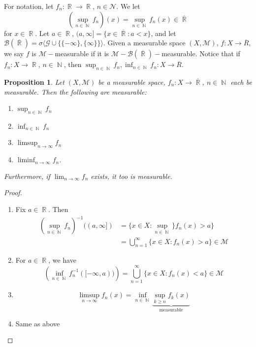 \documentclass[12pt, a4paper]{memoir}
\DeclareMathOperator{\N}{{\mathbb{N}}}
\DeclareMathOperator{\R}{{\mathbb{R}}}
\newtheorem{proposition}[theorem]{Proposition}
\theoremstyle{nonumberplain}
\newtheorem{proof}{Proof}
\begin{document}
For notation, let $f_n:\R\to\R$, $n\in\mathcal{N}$.
We let
\begin{equation}
    (\sup_{n\in\N} f_n)(x)=\sup_{n\in\N} f_n(x)\in\overline{\R}
\end{equation}
for $x\in \R$.
Let $a\in\R$, $(a,\infty]=\{x\in\overline{\R}:a<x\}$, and let $\mathcal{B}(\overline{\R})=\sigma\langle\mathcal{G}\cup\{\{-\infty\},\{\infty\}\}\rangle$.
Given a measurable space $(X,\mathcal{M})$, $f:X\to\overline{R}$, we say $f$ is $\mathcal{M}-$measurable if it is $\mathcal{M}-\mathcal{B}(\overline{\R})-$measurable.
Notice that if $f_n:X\to\R$, $n\in\N$, then $\sup_{n\in\N}f_n,\inf_{n\in\N}f_n:X\to\overline{R}$.
\begin{proposition}
    Let $(X,\mathcal{M})$ be a measurable space, $f_n:X\to\overline{\R}$, $n\in\N$ each be measurable.
    Then the following are measurable:
    \begin{enumerate}
        \item $\sup_{n\in\N}f_n$
        \item $\inf_{n\in\N}f_n$
        \item $\limsup_{n\to\infty}f_n$
        \item $\liminf_{n\to\infty}f_n$.
    \end{enumerate}
    Furthermore, if $\lim_{n\to\infty}f_n$ exists, it too is measurable.
\end{proposition}
\begin{proof}
    \begin{enumerate}
        \item Fix $a\in\R$.
            Then
            \begin{align*}
                \left(\sup_{n\in\N}f_n\right)^{-1}((a,\infty]) &= \{x\in X:\sup_{n\in\N}\}f_n(x)>a\}\\ %
                                                               &=\bigcup_{n=1}^\infty\{x\in X:f_n(x)>a\}\in\mathcal{M}
            \end{align*}
        \item For $a\in\R$, we have
            \begin{equation*}
                \left(\inf_{n\in\N}f_n^{-1}([-\infty,a))\right)=\bigcup_{n=1}^\infty\{x\in X:f_n(x)<a\}\in\mathcal{M} %
            \end{equation*}
        \item
            \begin{equation*}
                \limsup_{n\to\infty}f_n(x)=\inf_{n\in\N}\underbrace{\sup_{k\geq n}f_k(x)}_{\text{measurable}}
            \end{equation*}
        \item Same as above
    \end{enumerate}
\end{proof}
\end{document}
